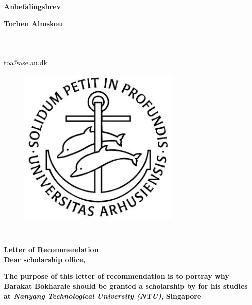 \documentclass[../Ansoegning.tex]{subfiles}
\begin{document}
\par{\centering
		{\Large \textbf{Anbefalingsbrev}} \par}

\begin{minipage}[t][1.3cm][t]{0.6\textwidth}
\textbf{Torben Almskou}             \\
  \\
      \\
          \\
 toa@ase.au.dk          \\
\end{minipage} %
\begin{minipage}[t][1.5cm][t]{0.25\textwidth}
\vspace{-1cm}
\begin{figure}[H]
	\flushright
	\includegraphics[width=0.7\textwidth]{Billeder/aulogo.JPG}
\end{figure}
\end{minipage} \\ \vspace{0.8cm}

\textbf{\Large Letter of Recommendation} \\
\textbf{Dear \textit{\FondNavn } scholarship office,}

\textbf{The purpose of this letter of recommendation is to portray why Barakat Bokharaie should be granted a scholarship by {\FondNavn } for his studies at \textit{Nanyang Technological University (NTU)}, Singapore}
\end{document}
